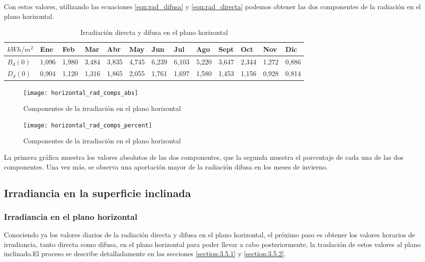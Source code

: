 Con estos valores, utilizando las ecuaciones \ref{eqn:rad_difusa} y \ref{eqn:rad_directa} podemos obtener las dos componentes de la radiación en el plano horizontal.

\begin{table}[ht]
\centering
\begin{tabular}{|l|l|l|l|l|l|l|l|l|l|l|l|l|}
\hline
$kWh/m^2$  & Ene   & Feb   & Mar   & Abr   & May   & Jun   & Jul   & Ago   & Sept  & Oct   & Nov    & Dic    \\ \hline
$B_{d}(0)$ & 1,096 & 1,980 & 3,484 & 3,835 & 4,745 & 6,239 & 6,103 & 5,220 & 3,647 & 2,344 & 1,272  & 0,886  \\ \hline
$D_{d}(0)$ & 0,904 & 1,120 & 1,316 & 1,865 & 2,055 & 1,761 & 1,697 & 1,580 & 1,453 & 1,156 & 0,928  & 0,814  \\ \hline
\end{tabular}
\label{tab:rad_components}
\caption{Irradiación directa y difusa en el plano horizontal}
\end{table}

\begin{figure}[H]
\texttt{[image: horizontal\_rad\_comps\_abs]}
\centering
\caption{Componentes de la irradiación en el plano horizontal}
\label{fig:rad_components_abs}
\end{figure}

\begin{figure}[H]
\texttt{[image: horizontal\_rad\_comps\_percent]}
\centering
\caption{Componentes de la irradiación en el plano horizontal}
\label{fig:rad_components_percent}
\end{figure}

La primera gráfica muestra los valores absolutos de las dos componentes, que la segunda muestra el porcentaje de cada una de las dos componentes. Una vez más, se observa una aportación mayor de la radiación difusa en los meses de invierno.

\subsection{Irradiancia en la superficie inclinada}

\subsubsection{Irradiancia en el plano horizontal}
Conociendo ya los valores diarios de la radiación directa y difusa en el plano horizontal, el próximo paso es obtener los valores horarios de irradiancia, tanto directa como difusa, en el plano horizontal para poder llevar a cabo posteriormente, la traslación de estos valores al plano inclinado.El proceso se describe detalladamente en las secciones \ref{section:3.5.1} y \ref{section:3.5.2}.

